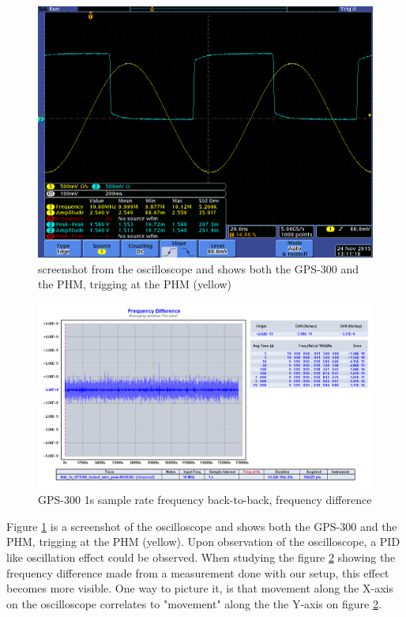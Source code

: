 \documentclass[11pt,english,a4paper]{article}
\begin{document}
\begin{figure}[!htb]
  \centering
    \includegraphics[width=1\textwidth]{tek00006.png}
      \caption{screenshot from the oscilloscope and shows both the GPS-300 and the PHM, trigging at the PHM (yellow)}
          \label{fig:tek00006}
\end{figure}

\begin{figure}[!htb]
  \centering
    \includegraphics[width=1\textwidth]{part1_spm5_freq_diff.png}
      \caption{GPS-300 1s sample rate frequency back-to-back, frequency difference}
          \label{fig:part1_spm5_freq_diff}
\end{figure}

Figure \ref{fig:tek00006} is a screenshot of the oscilloscope and shows both the GPS-300 and the PHM, trigging at the PHM (yellow). Upon observation of the oscilloscope, a PID like oscillation effect could be observed. When studying the figure \ref{fig:part1_spm5_freq_diff} showing the frequency difference made from a measurement done with our setup, this effect becomes more visible. One way to picture it, is that movement along the X-axis on the oscilloscope correlates to "movement" along the the Y-axis on figure \ref{fig:part1_spm5_freq_diff}. 
\end{document}
